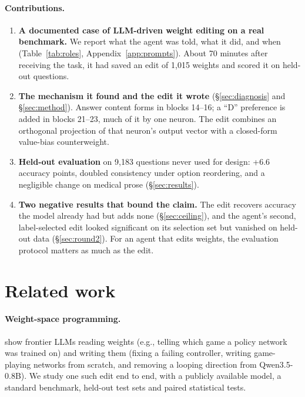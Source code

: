 \documentclass[11pt]{article}
\begin{document}
\paragraph{Contributions.}
\begin{enumerate}
\item \textbf{A documented case of LLM-driven weight editing on a real benchmark.} We report what the agent was told, what it did, and when (Table~\ref{tab:roles}, Appendix~\ref{app:prompts}). About 70 minutes after receiving the task, it had saved an edit of 1{,}015 weights and scored it on held-out questions.
\item \textbf{The mechanism it found and the edit it wrote} (\S\ref{sec:diagnosis} and \S\ref{sec:method}). Answer content forms in blocks 14--16; a ``D'' preference is added in blocks 21--23, much of it by one neuron. The edit combines an orthogonal projection of that neuron's output vector with a closed-form value-bias counterweight.
\item \textbf{Held-out evaluation} on 9{,}183 questions never used for design: +6.6 accuracy points, doubled consistency under option reordering, and a negligible change on medical prose (\S\ref{sec:results}).
\item \textbf{Two negative results that bound the claim.} The edit recovers accuracy the model already had but adds none (\S\ref{sec:ceiling}), and the agent's second, label-selected edit looked significant on its selection set but vanished on held-out data (\S\ref{sec:round2}). For an agent that edits weights, the evaluation protocol matters as much as the edit.
\end{enumerate}

\section{Related work}

\paragraph{Weight-space programming.} \citet{takehi2026weightspace} show frontier LLMs reading weights (e.g., telling which game a policy network was trained on) and writing them (fixing a failing controller, writing game-playing networks from scratch, and removing a looping direction from Qwen3.5-0.8B). We study one such edit end to end, with a publicly available model, a standard benchmark, held-out test sets and paired statistical tests.
\end{document}
